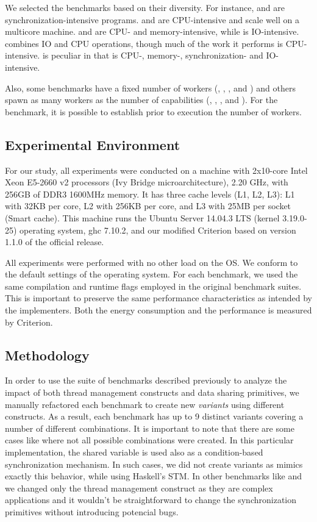 We selected the benchmarks based on their diversity. For instance, \chameneos and \dining are synchronization-intensive programs. \mandelbrot and \spectral are CPU-intensive and scale well on a multicore machine. \knucleotide and \regex are CPU- and memory-intensive, while \warp is IO-intensive. \tsearch combines IO and CPU operations, though much of the work it performs is CPU-intensive. \fasta is peculiar in that is CPU-, memory-, synchronization- and IO-intensive.

Also, some benchmarks have a fixed number of workers (\chameneos, \knucleotide, \regex, and \dining) and others spawn as many workers as the number of capabilities (\fasta, \mandelbrot, \spectral, \tsearch and \warp). For the \dining benchmark, it is possible to establish prior to execution the number of workers.

\subsection{Experimental Environment}
For our study, all experiments were conducted on a machine with 2x10-core Intel Xeon E5-2660 v2 processors (Ivy Bridge microarchitecture), 2.20 GHz, with 256GB of DDR3 1600MHz memory. It has three cache levels (L1, L2, L3): L1 with 32KB per core, L2 with 256KB per core, and L3 with 25MB per socket (Smart cache). This machine runs the Ubuntu Server 14.04.3 LTS (kernel 3.19.0-25) operating system, \acs{ghc} 7.10.2, and our modified Criterion based on version 1.1.0 of the official release.

All experiments were performed with no other load on the OS. We conform to the default settings of the operating system. For each benchmark, we used the same compilation and runtime flags employed in the original benchmark suites. This is important to preserve the same performance characteristics as intended by the implementers. Both the energy consumption and the performance is measured by Criterion.

\subsection{Methodology}
In order to use the suite of benchmarks described previously to analyze the impact of both thread management constructs and data sharing primitives, we manually refactored each benchmark to create new \emph{variants} using different constructs. As a result, each benchmark has up to 9 distinct variants covering a number of different combinations. It is important to note that there are some cases like \dining where not all possible combinations were created. In this particular implementation, the shared variable is used also as a condition-based synchronization mechanism. In such cases, we did not create \TVar variants as \TMVar mimics exactly this behavior, while using Haskell's STM. In other benchmarks like \tsearch and \warp we changed only the thread management construct as they are complex applications and it wouldn't be straightforward to change the synchronization primitives without introducing potencial bugs.

